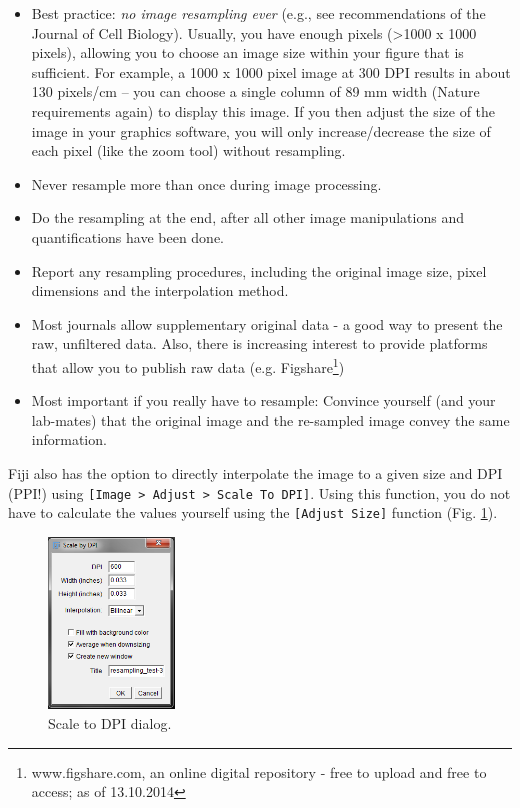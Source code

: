 \begin{itemize}
	\item Best practice: \emph{no image resampling ever} (e.g., see recommendations of the Journal of Cell Biology). Usually, you have enough pixels (>1000 x 1000 pixels), allowing you to choose an image size within your figure that is sufficient. For example, a 1000 x 1000 pixel image at 300 DPI results in about 130 pixels/cm -- you can choose a single column of 89 mm width (Nature requirements again) to display this image. If you then adjust the size of the image in your graphics software, you will only increase/decrease the size of each pixel (like the zoom tool) without resampling.
	\item Never resample more than once during image processing.
	\item Do the resampling at the end, after all other image manipulations and quantifications have been done.	
	\item Report any resampling procedures, including the original image size, pixel dimensions and the interpolation method.
	\item Most journals allow supplementary original data - a good way to present the raw, unfiltered data. Also, there is increasing interest to provide platforms that allow you to publish raw data (e.g. Figshare\footnote{www.figshare.com, an online digital repository - free to upload and free to access; as of 13.10.2014})
	\item Most important if you really have to resample: Convince yourself (and your lab-mates) that the original image and the re-sampled image convey the same information.
\end{itemize}

Fiji also has the option to directly interpolate the image to a given size and DPI (PPI!) using \texttt{[Image > Adjust > Scale To DPI]}. Using this function, you do not have to calculate the values yourself using the \texttt{[Adjust Size]} function (Fig. \ref{fig:scale-to-dpi-dialog}).
\begin{figure}[!h]
	\centering
		\includegraphics[width=0.3\textwidth]{mod1/figures/scale-to-dpi-dialog.png}
	\caption{Scale to DPI dialog.}
	\label{fig:scale-to-dpi-dialog}
\end{figure}

